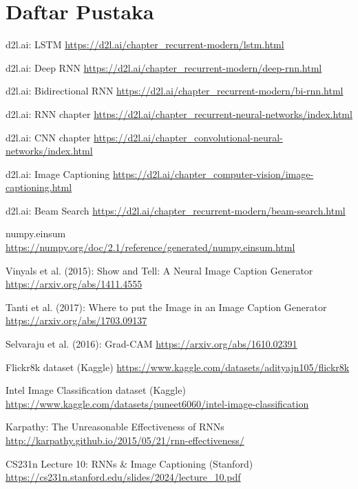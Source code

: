 
\chapter*{Daftar Pustaka}

\begin{enumerate}[label={[\arabic*]}]
    \item d2l.ai: LSTM \url{https://d2l.ai/chapter_recurrent-modern/lstm.html}
    \item d2l.ai: Deep RNN \url{https://d2l.ai/chapter_recurrent-modern/deep-rnn.html}
    \item d2l.ai: Bidirectional RNN \url{https://d2l.ai/chapter_recurrent-modern/bi-rnn.html}
    \item d2l.ai: RNN chapter \url{https://d2l.ai/chapter_recurrent-neural-networks/index.html}
    \item d2l.ai: CNN chapter \url{https://d2l.ai/chapter_convolutional-neural-networks/index.html}
    \item d2l.ai: Image Captioning \url{https://d2l.ai/chapter_computer-vision/image-captioning.html}
    \item d2l.ai: Beam Search \url{https://d2l.ai/chapter_recurrent-modern/beam-search.html}
    \item numpy.einsum \url{https://numpy.org/doc/2.1/reference/generated/numpy.einsum.html}
    \item Vinyals et al. (2015): Show and Tell: A Neural Image Caption Generator \url{https://arxiv.org/abs/1411.4555}
    \item Tanti et al. (2017): Where to put the Image in an Image Caption Generator \url{https://arxiv.org/abs/1703.09137}
    \item Selvaraju et al. (2016): Grad-CAM \url{https://arxiv.org/abs/1610.02391}
    \item Flickr8k dataset (Kaggle) \url{https://www.kaggle.com/datasets/adityajn105/flickr8k}
    \item Intel Image Classification dataset (Kaggle) \url{https://www.kaggle.com/datasets/puneet6060/intel-image-classification}
    \item Karpathy: The Unreasonable Effectiveness of RNNs \url{http://karpathy.github.io/2015/05/21/rnn-effectiveness/}
    \item CS231n Lecture 10: RNNs \& Image Captioning (Stanford) \url{https://cs231n.stanford.edu/slides/2024/lecture_10.pdf}
\end{enumerate}
